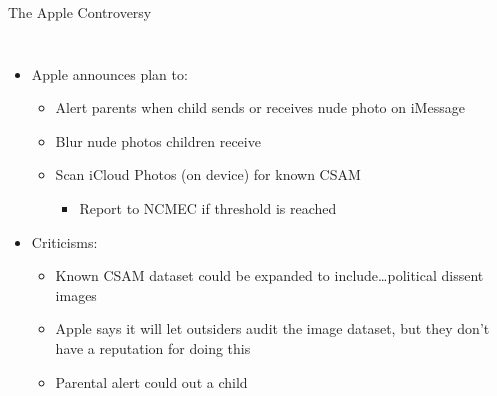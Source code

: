 \documentclass[nobackground,dvipsnames,table,aspectratio=169]{beamer}
\begin{document}
\begin{frame}{The Apple Controversy}
    \begin{columns}
            \begin{itemize}
                \item Apple announces plan to: 
                \begin{itemize}
                    \item Alert parents when child sends or receives nude photo on iMessage
                    \item Blur nude photos children receive
                    \item Scan iCloud Photos (on device) for known CSAM
                    \begin{itemize}
                        \item Report to NCMEC if threshold is reached
                    \end{itemize}
                \end{itemize}
                \item Criticisms:
                \begin{itemize}
                    \item Known CSAM dataset could be expanded to include…political dissent images
                    \item Apple says it will let outsiders audit the image dataset, but they don’t have a reputation for doing this
                    \item Parental alert could out a child
                \end{itemize}
            \end{itemize}
            \centering

\end{columns}
\end{frame}
\end{document}
